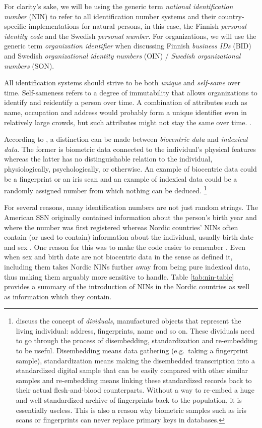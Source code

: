 For clarity's sake, we will be using the generic term \emph{national identification number} (NIN) to refer to all identification number systems and their country-specific implementations for natural persons, in this case, the Finnish \emph{personal identity code} and the Swedish \emph{personal number}. For organizations, we will use the generic term \emph{organization identifier} when discussing Finnish \emph{business IDs} (BID) and Swedish \emph{organizational identity numbers} (OIN) / \emph{Swedish organizational numbers} (SON).

All identification systems should strive to be both \emph{unique} and \emph{self-same} over time. Self-sameness refers to a degree of immutability that allows organizations to identify and reidentify a person over time. A combination of attributes such as name, occupation and address would probably form a unique identifier even in relatively large crowds, but such attributes might not stay the same over time. \citep{brensinger2021}.

According to \citet{Alterman2003}, a distinction can be made between \emph{biocentric data} and \emph{indexical data}. The former is biometric data connected to the individual's physical features whereas the latter has no distinguishable relation to the individual, physiologically, psychologically, or otherwise. An example of biocentric data could be a fingerprint or an iris scan and an example of indexical data could be a randomly assigned number from which nothing can be deduced. \footnote{\citet{brensinger2021} discuss the concept of \emph{dividuals}, manufactured objects that represent the living individual: address, fingerprints, name and so on. These dividuals need to go through the process of disembedding, standardization and re-embedding to be useful. Disembedding means data gathering (e.g.~taking a fingerprint sample), standardization means making the disembedded transcription into a standardized digital sample that can be easily compared with other similar samples and re-embedding means linking these standardized records back to their actual flesh-and-blood counterparts. Without a way to re-embed a huge and well-standardized archive of fingerprints back to the population, it is essentially useless. This is also a reason why biometric samples such as iris scans or fingerprints can never replace primary keys in databases.}

For several reasons, many identification numbers are not just random strings. The American SSN originally contained information about the person's birth year and where the number was first registered \citep[32]{brensinger2021} whereas Nordic countries' NINs often contain (or used to contain) information about the individual, usually birth date and sex \citep{watson2010, salste2021}. One reason for this was to make the code easier to remember \citep{alastalo2022}. Even when sex and birth date are not biocentric data in the sense as \citet{Alterman2003} defined it, including them takes Nordic NINs further away from being pure indexical data, thus making them arguably more sensitive to handle. Table \ref{tab:nin-table} provides a summary of the introduction of NINs in the Nordic countries as well as information which they contain.

